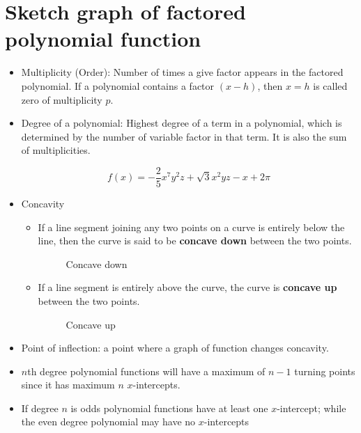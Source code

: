 
\chapter{Sketch graph of factored polynomial function}
\begin{itemize}
    \item Multiplicity (Order): Number of times a give factor appears in the factored polynomial. If a polynomial contains a factor $(x-h)$, then $x=h$ is called zero of multiplicity $p$.
    \item Degree of a polynomial: Highest degree of a term in a polynomial, which is determined by the number of variable factor in that term. It is also the sum of multiplicities.
        \begin{eg}
            \[
                f(x)=-\frac{2}{5}x^7 y^2 z+\sqrt{3}x^2 yz-x+2\pi
            \]
        \end{eg}
    \item Concavity
        \begin{itemize}
                \item If a line segment joining any two points on a curve is entirely below the line, then the curve is said to be \textbf{concave down} between the two points.
                    \begin{figure}[H]
                        \centering
                        \caption{Concave down}
                    \end{figure}
                \item If a line segment is entirely above the curve, the curve is \textbf{concave up} between the two points.
                    \begin{figure}[H]
                        \centering
                        \caption{Concave up}
                    \end{figure}
        \end{itemize}
    \item Point of inflection: a point where a graph of function changes concavity.
    \item $n$th degree polynomial functions will have a maximum of $n-1$ turning points since it has maximum $n$ $x$-intercepts.
    \item If degree $n$ is odds polynomial functions have at least one $x$-intercept; while the even degree polynomial may have no $x$-intercepts
\end{itemize}

